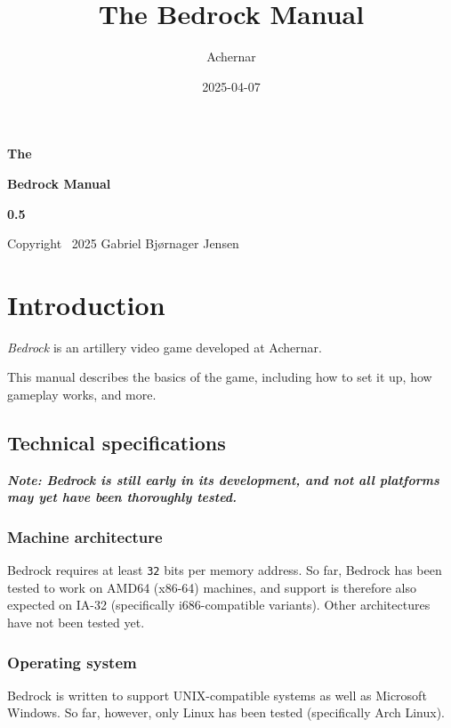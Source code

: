 \documentclass[a5paper, twoside]{report}
\author{Achernar}
\title{The Bedrock Manual}
\date{2025-04-07}
\begin{document}
	\thispagestyle{empty}

	\begin{center}
		\vspace*{\fill}
		{\large\bfseries The}

		{\huge\bfseries Bedrock Manual}

		{\large\bfseries 0.5}

		\vspace*{\fill}
		{\small Copyright \textcopyright\ 2025 Gabriel Bjørnager Jensen}
	\end{center}

	\clearpage

	\tableofcontents

	\clearpage
	\chapter{Introduction}
		\textit{Bedrock} is an artillery video game developed at Achernar.

		This manual describes the basics of the game, including how to set it up, how gameplay works, and more.

		\section{Technical specifications}
			\begin{mdframed}
				\small\itshape\bfseries
				Note: Bedrock is still early in its development, and not all platforms may yet have been thoroughly tested.
			\end{mdframed}

			\subsection{Machine architecture}
				Bedrock requires at least \texttt{32} bits per memory address.
				So far, Bedrock has been tested to work on AMD64 (x86-64) machines, and support is therefore also expected on IA-32 (specifically i686-compatible variants).
				Other architectures have not been tested yet.

			\subsection{Operating system}
				Bedrock is written to support UNIX-compatible systems as well as Microsoft Windows.
				So far, however, only Linux has been tested (specifically Arch Linux).
\end{document}
